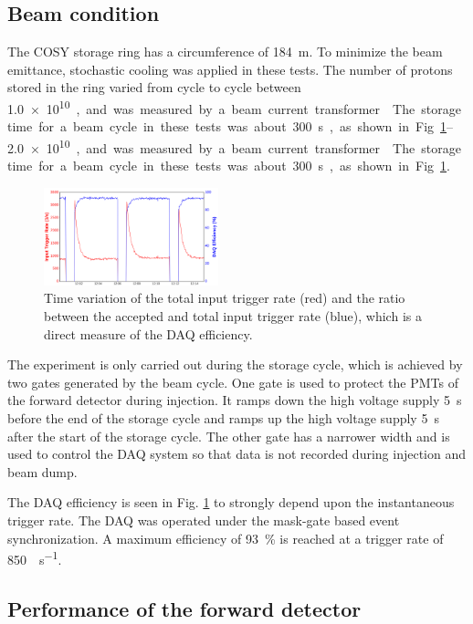 \documentclass[number,5p]{elsarticle}
\begin{document}
\subsection{Beam condition}
\label{sec:beam}
The COSY storage ring has a circumference of \SI{184}{\meter}.
To minimize the beam emittance, stochastic cooling \cite{cooling} was applied in
these tests.
The number of protons stored in the ring varied from cycle to cycle between
\SIrange{1.0e10}{2.0e10}, and was measured by a beam current transformer \cite{bct}.
The storage time for a beam cycle in these tests was about \SI{300}{\second}, as shown in Fig. \ref{fig:beam}.
\begin{figure}[h]
  \centering
  \includegraphics[width=0.45\textwidth]{./daq_efficiency.png}
  \caption{Time variation of the total input trigger rate (red) and the ratio between the accepted and total input trigger rate (blue), which is a direct measure of the DAQ efficiency.}
  \label{fig:beam}
\end{figure}

The experiment is only carried out during the storage cycle, which is achieved by two
gates generated by the beam cycle.
One gate is used to protect the PMTs of the forward detector during injection.
It ramps down the high voltage supply \SI{5}{\second} before the end of the
storage cycle and ramps up the high voltage supply \SI{5}{\second} after the start of the storage cycle.
The other gate has a narrower width and is used to control the DAQ system so
that data is not recorded during injection and beam dump.

The DAQ efficiency is seen in Fig. \ref{fig:beam} to strongly depend upon the
instantaneous trigger rate.
The DAQ was operated under the mask-gate based event synchronization.
A maximum efficiency of \SI{93}{\percent} is reached at a trigger rate of \SI{850}{\event\per\second}.

\subsection{Performance of the forward detector}
\label{sec:fwd_performance}
\end{document}
